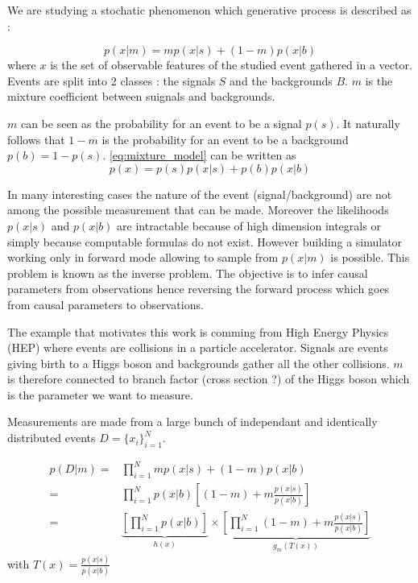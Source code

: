 
We are studying a stochatic phenomenon which generative process is described as :

\begin{equation}
	\label{eq:mixture_model}
	p(x|m) = m p(x|s) + (1-m) p(x|b)
\end{equation}
where $x$ is the set of observable features of the studied event gathered in a vector.
Events are split into 2 classes : the signals $S$ and the backgrounds $B$.
$m$ is the mixture coefficient between suignals and backgrounds.

$m$ can be seen as the probability for an event to be a signal $p(s)$. 
It naturally follows that $1-m$ is the probability for an event to be a background $p(b)=1-p(s)$.
\autoref{eq:mixture_model} can be written as
\begin{equation}
	p(x) = p(s)p(x|s) + p(b)p(x|b)
\end{equation}

In many interesting cases the nature of the event (signal/background) are not among the possible measurement that can be made.
Moreover the likelihoods $p(x|s)$ and $p(x|b)$ are intractable because of high dimension integrals or simply because computable formulas do not exist.
However building a simulator working only in forward mode allowing to sample from $p(x|m)$ is possible.
This problem is known as the inverse problem. 
The objective is to infer causal parameters from observations hence reversing the forward process which goes from causal parameters to observations.


The example that motivates this work is comming from High Energy Physics (HEP) where events are collisions in a particle accelerator.
Signals are events giving birth to a Higgs boson and backgrounds gather all the other collisions.
$m$ is therefore connected to branch factor (cross section ?) of the Higgs boson which is the parameter we want to measure.


Measurements are made from a large bunch of independant and identically distributed events $D=\{x_i\}_{i=1}^N$.

\begin{align*}
	p(D|m) =& \prod_{i=1}^N m p(x|s) + (1-m) p(x|b) \\
	       =& \prod_{i=1}^N p(x|b) \left [(1-m) + m \frac{p(x|s)}{p(x|b)} \right ]\\
	       =& \underbrace{\left[ \prod_{i=1}^N p(x|b) \right ]}_{h(x)} \times 
	       \underbrace{\left [\prod_{i=1}^N (1-m) + m \frac{p(x|s)}{p(x|b)} \right ]}_{g_m(T(x))}
\end{align*}
with $T(x) = \frac{p(x|s)}{p(x|b)} $

